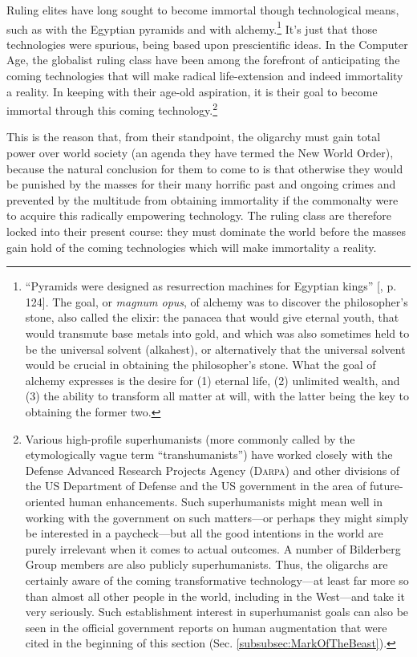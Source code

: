 \documentclass[letterpaper,12pt]{article}
\begin{document}
Ruling elites have long sought to become immortal though technological means, such as with the Egyptian pyramids and with alchemy.\footnote{``Pyramids were designed as resurrection machines for Egyptian kings'' [, p. 124]. The goal, or \emph{magnum opus}, of alchemy was to discover the philosopher's stone, also called the elixir: the panacea that would give eternal youth, that would transmute base metals into gold, and which was also sometimes held to be the universal solvent (alkahest), or alternatively that the universal solvent would be crucial in obtaining the philosopher's stone. What the goal of alchemy expresses is the desire for (1) eternal life, (2) unlimited wealth, and (3) the ability to transform all matter at will, with the latter being the key to obtaining the former two.} It's just that those technologies were spurious, being based upon prescientific ideas. In the Computer Age, the globalist ruling class have been among the forefront of anticipating the coming technologies that will make radical life-extension and indeed immortality a reality. In keeping with their age-old aspiration, it is their goal to become immortal through this coming technology.\footnote{Various high-profile superhumanists (more commonly called by the etymologically vague term ``transhumanists'') have worked closely with the Defense Advanced Research Projects Agency (\textsc{Darpa}) and other divisions of the US Department of Defense and the US government in the area of future-oriented human enhancements. Such superhumanists might mean well in working with the government on such matters---or perhaps they might simply be interested in a paycheck---but all the good intentions in the world are purely irrelevant when it comes to actual outcomes. A number of Bilderberg Group members are also publicly superhumanists. Thus, the oligarchs are certainly aware of the coming transformative technology---at least far more so than almost all other people in the world, including in the West---and take it very seriously. Such establishment interest in superhumanist goals can also be seen in the official government reports \cite{MOD2007,OsborneEtAl1996,RocoBainbridge2003} on human augmentation that were cited in the beginning of this section (Sec. \ref{subsubsec:MarkOfTheBeast}).}

This is the reason that, from their standpoint, the oligarchy must gain total power over world society (an agenda they have termed the New World Order), because the natural conclusion for them to come to is that otherwise they would be punished by the masses for their many horrific past and ongoing crimes and prevented by the multitude from obtaining immortality if the commonalty were to acquire this radically empowering technology. The ruling class are therefore locked into their present course: they must dominate the world before the masses gain hold of the coming technologies which will make immortality a reality.
\end{document}
